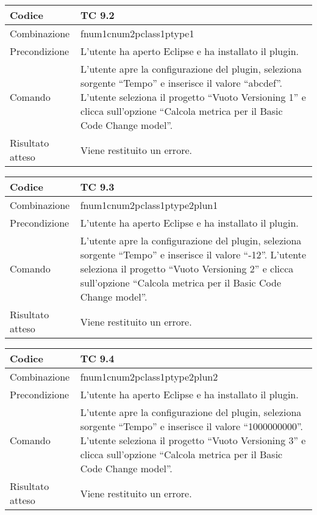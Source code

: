 \begin{table}[ht]
\begin{tabular}{|p{3cm}|p{9cm}|}
\hline
\cellcolor{lightgray}Codice				& TC 9.2								\\
\hline
\cellcolor{lightgray}Combinazione		& fnum1cnum2pclass1ptype1									\\
\hline
\cellcolor{lightgray}Precondizione		& L'utente ha aperto Eclipse e ha installato il plugin.		\\
\hline
\cellcolor{lightgray}Comando			& L'utente apre la configurazione del plugin, seleziona sorgente ``Tempo'' e inserisce il valore ``abcdef''. L'utente seleziona il progetto ``Vuoto Versioning 1''  e clicca sull'opzione ``Calcola metrica per il Basic Code Change model''.	\\
\hline
\cellcolor{lightgray}Risultato atteso	& Viene restituito un errore.\\
\hline
\end{tabular}
\end{table}


\begin{table}[ht]
\begin{tabular}{|p{3cm}|p{9cm}|}
\hline
\cellcolor{lightgray}Codice				& TC 9.3								\\
\hline
\cellcolor{lightgray}Combinazione		& fnum1cnum2pclass1ptype2plun1									\\
\hline
\cellcolor{lightgray}Precondizione		& L'utente ha aperto Eclipse e ha installato il plugin.		\\
\hline
\cellcolor{lightgray}Comando			& L'utente apre la configurazione del plugin, seleziona sorgente ``Tempo'' e inserisce il valore ``-12''. L'utente seleziona il progetto ``Vuoto Versioning 2''  e clicca sull'opzione ``Calcola metrica per il Basic Code Change model''.	\\
\hline
\cellcolor{lightgray}Risultato atteso	& Viene restituito un errore.\\
\hline
\end{tabular}
\end{table}


\begin{table}[ht]
\begin{tabular}{|p{3cm}|p{9cm}|}
\hline
\cellcolor{lightgray}Codice				& TC 9.4								\\
\hline
\cellcolor{lightgray}Combinazione		& fnum1cnum2pclass1ptype2plun2									\\
\hline
\cellcolor{lightgray}Precondizione		& L'utente ha aperto Eclipse e ha installato il plugin.		\\
\hline
\cellcolor{lightgray}Comando			& L'utente apre la configurazione del plugin, seleziona sorgente ``Tempo'' e inserisce il valore ``1000000000''. L'utente seleziona il progetto ``Vuoto Versioning 3''  e clicca sull'opzione ``Calcola metrica per il Basic Code Change model''.	\\
\hline
\cellcolor{lightgray}Risultato atteso	& Viene restituito un errore.\\
\hline
\end{tabular}
\end{table}


